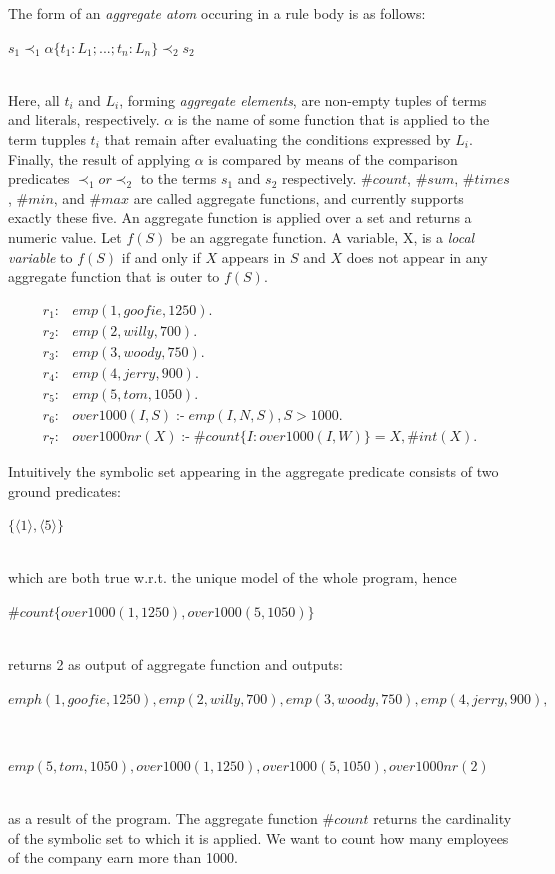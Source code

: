 \documentclass[14pt,a4paper, titlepage]{article}
\DeclareMathOperator{\leftimpl}{:-}
\begin{document}
The form of an \emph{aggregate atom} occuring in a rule body is as follows:\\ \centerline{$s_1 \prec_1 \alpha \{ t_1:L_1;...;t_n:L_n\} \prec_2 s_2$} 
\\ Here, all $\mathit{t_i}$ and $\mathit{L_i}$, forming \emph{aggregate elements}, are non-empty tuples of terms and literals, respectively. $\alpha$ is the name of some function that is applied to the term tupples \texttt{$t_i$} that remain after evaluating the conditions expressed by $L_i$. Finally,  the result of applying $\alpha$ is compared by means of the comparison predicates $\prec_1 or \prec_2$ to the terms $s_1$ and $s_2$ respectively. $\mathit{\#count}$, $\mathit{\#sum}$, $\mathit{\#times}$, $\mathit{\#min}$, and $\mathit{\#max}$ are called aggregate functions, and \dlvhex{} currently supports exactly these five. An aggregate function is applied over a set and returns a numeric value. Let $f(S)$ be an aggregate function. A variable, X, is a \emph{local variable} to $f(S)$ if and only if $X$ appears in $S$ and $X$ does not appear in any aggregate function that is outer to $f(S)$.
\begin{exmp}
\begin{align*}
r_1\colon& emp(1,goofie,1250).\\
r_2\colon& emp(2,willy,700).\\
r_3\colon& emp(3,woody,750).\\
r_4\colon& emp(4,jerry,900).\\
r_5\colon& emp(5,tom,1050). \\
r_6\colon& over1000(I,S) \leftimpl emp(I,N,S), S > 1000.\\
r_7\colon& over1000nr(X) \leftimpl \#count\{I : over1000(I,W)\} = X, \#int(X).
\end{align*}
\end{exmp}
Intuitively the symbolic set appearing in the aggregate predicate consists of two ground predicates: \\ \centerline{$\{\langle 1 \rangle,\langle 5 \rangle\}$}
\\which are both true w.r.t. the unique model of the whole program, hence \\ \centerline{$ \#count\{over1000(1,1250),over1000(5,1050)\}$} \\returns 2 as output of aggregate function and outputs:\\ \centerline{ $\mathit{emph(1,goofie,1250),emp(2,willy,700),emp(3,woody,750),emp(4,jerry,900),}$}
\\ \centerline{ $\mathit{emp(5,tom,1050),over1000(1,1250),over1000(5,1050),over1000nr(2)}$}
\\as a result of the program.
The aggregate function $\mathit{\#count}$ returns the cardinality of the symbolic set to which it is applied. We want to count how many employees of the company earn more than 1000. 
\end{document}

